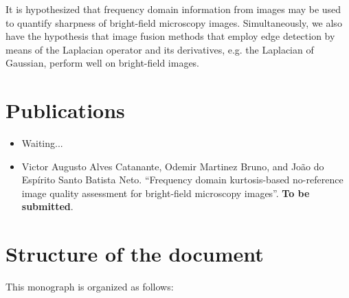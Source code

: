 It is hypothesized that frequency domain information from images may be used to quantify sharpness of bright-field microscopy images. Simultaneously, we also have the hypothesis that image fusion methods that employ edge detection by means of the Laplacian operator and its derivatives, e.g. the Laplacian of Gaussian, perform well on bright-field images. 

\section{Publications}

\begin{itemize}
    \item Waiting...
    
    \item \cite{catanante2020frequency} Victor Augusto Alves Catanante, Odemir Martinez Bruno, and João do Espírito Santo Batista Neto. ``Frequency domain kurtosis-based no-reference image quality assessment for bright-field microscopy images''. \textbf{To be submitted}.
\end{itemize}

\section*{Structure of the document}

This monograph is organized as follows:

